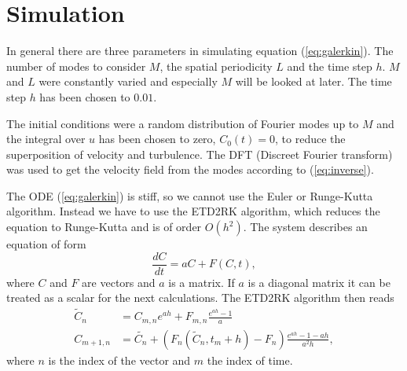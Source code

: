 \section{Simulation}
In general there are three parameters in simulating equation (\ref{eq:galerkin}). The number of modes to consider $M$, the spatial periodicity $L$ and the time step $h$. $M$ and $L$ were constantly varied and especially $M$ will be looked at later. The time step $h$ has been chosen to $0.01$.

The initial conditions were a random distribution of Fourier modes up to $M$ and the integral over $u$ has been chosen to zero, $C_0(t) = 0$, to reduce the superposition of velocity and turbulence. The DFT (Discreet Fourier transform) was used to get the velocity field from the modes according to (\ref{eq:inverse}).

The ODE (\ref{eq:galerkin}) is stiff, so we cannot use the Euler or Runge-Kutta algorithm. Instead we have to use the ETD2RK algorithm, which reduces the equation to Runge-Kutta and is of order $O(h^2)$. The system describes an equation of form
\begin{equation}
  \frac{d C}{dt} = aC + F(C,t),
\end{equation}
where $C$ and $F$ are vectors and $a$ is a matrix. If $a$ is a diagonal matrix it can be treated as a scalar for the next calculations. The ETD2RK algorithm then reads
\begin{align}
  \tilde{C}_n & = C_{m,n} e^{ah} + F_{m,n} \frac{e^{ah} - 1}{a} \\
  C_{m + 1,n} & = \tilde{C_n} + \left(F_n(\tilde{C}_n, t_m + h) - F_n \right) \frac{e^{ah} - 1 - ah}{a^2 h},
\end{align}
where $n$ is the index of the vector and $m$ the index of time.

